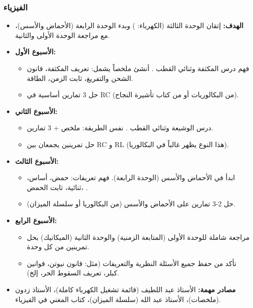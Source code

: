\documentclass[12pt,a4paper]{book}
\begin{document}
	\subsubsection*{الفيزياء}
	\begin{itemize}
		\item \textbf{الهدف:} إتقان الوحدة الثالثة (الكهرباء: ) وبدء الوحدة الرابعة (الأحماض والأسس)، مع مراجعة الوحدة الأولى والثانية.
		\item \textbf{الأسبوع الأول:}
		\begin{itemize}
			\item فهم درس المكثفة وثنائي القطب . أنشئ ملخصاً يشمل: تعريف المكثفة، قانون الشحن والتفريغ، ثابت الزمن، الطاقة.
			\item حل 3 تمارين أساسية في RC (من البكالوريات أو من كتاب تأشيرة النجاح).
		\end{itemize}
		\item \textbf{الأسبوع الثاني:}
		\begin{itemize}
			\item درس الوشيعة وثنائي القطب . نفس الطريقة: ملخص + 3 تمارين.
			\item حل تمرينين يجمعان بين RC و RL (هذا النوع يظهر غالباً في البكالوريا).
		\end{itemize}
		\item \textbf{الأسبوع الثالث:}
		\begin{itemize}
			\item ابدأ في الأحماض والأسس (الوحدة الرابعة). فهم تعريفات: حمض، أساس، ثنائية، ثابت الحمض، .
			\item حل 2-3 تمارين على الأحماض والأسس (من البكالوريا أو سلسلة الميزان).
		\end{itemize}
		\item \textbf{الأسبوع الرابع:}
		\begin{itemize}
			\item مراجعة شاملة للوحدة الأولى (المتابعة الزمنية) والوحدة الثانية (الميكانيك) بحل تمرينين من كل وحدة.
			\item تأكد من حفظ جميع الأسئلة النظرية والتعريفات (مثل: قانون نيوتن، قوانين كبلر، تعريف السقوط الحر، إلخ).
		\end{itemize}
		\item \textbf{مصادر مهمة:} الأستاذ عبد اللطيف (قائمة تشغيل الكهرباء كاملة)، الأستاذ زدون (ملخصات)، الأستاذ عبد الله (سلسلة الميزان)، كتاب المغني في الفيزياء.
	\end{itemize}
	
\end{document}
